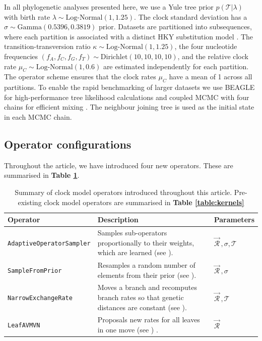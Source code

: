 \documentclass[10pt,letterpaper]{article}
\begin{document}
In all phylogenetic analyses presented here, we use a Yule \cite{yule1925ii} tree prior $p(\mathcal{T}|\lambda)$ with birth rate $\lambda \sim \text{Log-Normal}(1,1.25)$.
The clock standard deviation has a $\sigma \sim \text{Gamma}(0.5396,0.3819)$ prior.
Datasets are partitioned into subsequences, where each partition is associated with a distinct HKY substitution model \cite{hasegawa1985dating}.
The transition-transversion ratio $\kappa \sim \text{Log-Normal}(1, 1.25)$, the four nucleotide frequencies $(f_A, f_C, f_G, f_T) \sim \text{Dirichlet}(10,10,10,10)$, and the relative clock rate $\mu_C \sim \text{Log-Normal}(1, 0.6)$ are estimated independently for each partition.
The operator scheme ensures that the clock rates $\mu_C$ have a mean of 1 across all partitions. 
To enable the rapid benchmarking of larger datasets we use BEAGLE for high-performance tree likelihood calculations \cite{ayres2012beagle} and coupled MCMC with four chains for efficient mixing \cite{muller2019coupled}.
The neighbour joining tree \cite{saitou1987neighbor} is used as the initial state in each MCMC chain.



\subsection*{Operator configurations} \label{sect:operatorSchemes}


Throughout the article, we have introduced four new operators. 
These are summarised in \textbf{Table \ref{table:newOperators}}.


\begin{table}[h!]
\centering
\begin{tabular}{|l p{4cm} l|} 
 \hline
 Operator & Description & Parameters  \\
  \hline
 \texttt{AdaptiveOperatorSampler} & Samples sub-operators proportionally to their weights, which are learned (see \nameref{sect:adaptiveSampling}). & $\vec{\mathcal{R}}^{\,}, \sigma, \mathcal{T}$ \\
  \hline
 \texttt{SampleFromPrior} & Resamples a random number of elements from their prior (see \nameref{sect:adaptiveSampling}). & $\vec{\mathcal{R}}^{\,}, \sigma$ \\
  \hline
 \texttt{NarrowExchangeRate} & Moves a branch and recomputes branch rates so that genetic distances are constant (see \nameref{sect:NER}). & $\vec{\mathcal{R}}^{\,}, \mathcal{T}$\\
  \hline
 \texttt{LeafAVMVN}  & Proposals new rates for all leaves in one move (see \nameref{AVMVN_sect}) \cite{baele2017adaptive}. & $\vec{\mathcal{R}}^{\,}$ \\
  \hline
\end{tabular}
\caption{Summary of clock model operators introduced throughout this article. Pre-existing clock model operators are summarised in \textbf{Table \ref{table:kernels}}}
\label{table:newOperators}
\end{table}
\end{document}
